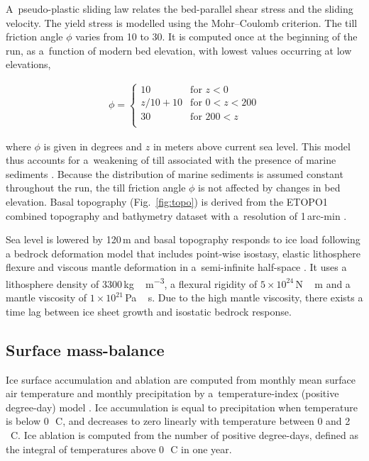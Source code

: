 \documentclass[tc, ms]{copernicus}
\begin{document}
A~pseudo-plastic sliding law \citep{aschwanden-etal-2013} relates the bed-parallel shear stress and the sliding velocity. The yield stress is modelled using the Mohr--Coulomb criterion. The till friction angle $\phi$ varies from 10 to 30{\degree}. It is computed once at the beginning of the run, as a~function of modern bed elevation, with lowest values occurring at low elevations,

\begin{align}
  \phi =
  \begin{cases}
    10      & \text{for }       z<  0 \\
    z/10+10 & \text{for }    0 <z<200 \\
    30      & \text{for }  200 <z     \\
  \end{cases}
\end{align}

where $\phi$ is given in degrees and $z$ in meters above current sea level. This model thus accounts for a~weakening of till associated with the presence of marine sediments \citep{martin-etal-2011,aschwanden-etal-2013}. Because the distribution of marine sediments is assumed constant throughout the run, the till friction angle $\phi$ is not affected by changes in bed elevation. Basal topography (Fig.~\ref{fig:topo}) is derived from the ETOPO1 combined topography and bathymetry dataset with a~resolution of 1\,arc-min \citep{data:etopo1}.

Sea level is lowered by 120\,m and basal topography responds to ice load following a bedrock deformation model that includes point-wise isostasy, elastic lithosphere flexure and viscous mantle deformation in a~semi-infinite half-space \citep{lingle-clark-1985,bueler-etal-2007}. It uses a lithosphere density of 3300\,\unit{kg\,m^{-3}}, a flexural rigidity of $5 \times 10^{24}$\,\unit{N\,m} and a mantle viscosity of $1 \times 10^{21}$\,\unit{Pa\,s}. Due to the high mantle viscosity, there exists a time lag between ice sheet growth and isostatic bedrock response.

\subsection{Surface mass-balance}

Ice surface accumulation and ablation are computed from monthly mean surface air temperature and monthly precipitation by a~temperature-index (positive degree-day) model \citep{hock-2003}. Ice accumulation is equal to precipitation when temperature is below 0\,\unit{{\degree}C}, and decreases to zero linearly with temperature between 0 and 2\,\unit{{\degree}C}. Ice ablation is computed from the number of positive degree-days, defined as the integral of temperatures above 0\,\unit{{\degree}C} in one year. 
\end{document}
